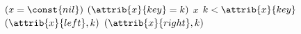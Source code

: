 \begin{codebox}
\li \If $(x = \const{nil})$ \Or $(\attrib{x}{key} = k)$
\li \Then
		\Return $x$
\li \ElseIf $k < \attrib{x}{key}$
\li \Then	
		\Return {}$(\attrib{x}{left},k)$
\li \ElseNoIf
\li 	\Return {}$(\attrib{x}{right},k)$
	\End
\end{codebox}